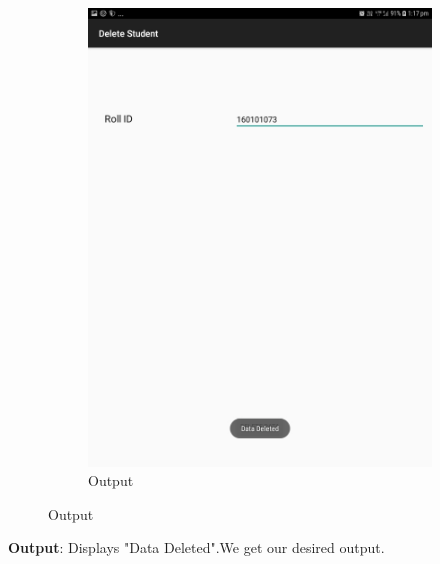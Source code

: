 \documentclass{scrreprt}
\begin{document}
\begin{itemize}
\begin{enumerate}
\begin{figure}[H]
\begin{subfigure}{0.5\textwidth}
\includegraphics[width=0.85\linewidth, keepaspectratio]{deletedone.jpg}
\caption{Output}
\label{fig:subim2}
\end{subfigure}
\end{figure}
\textbf{Output}: Displays "Data Deleted".We get our desired output.
\end{enumerate}
\end{itemize}
\end{document}
